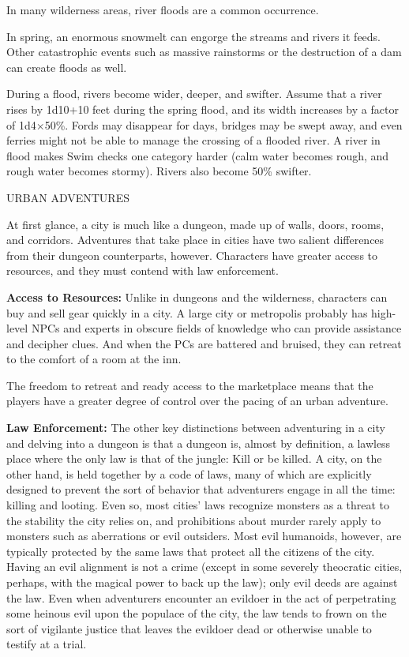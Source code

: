 \documentclass{article}
\begin{document}
In many wilderness areas, river floods are a common occurrence.

In spring, an enormous snowmelt can engorge the streams and rivers it feeds. Other 
catastrophic events such as massive rainstorms or the destruction of a dam can 
create floods as well.

During a flood, rivers become wider, deeper, and swifter. Assume that a river rises 
by 1d10+10 feet during the spring flood, and its width increases by a factor of 
1d4\ensuremath{\times}50\%. Fords may disappear for days, bridges may be swept 
away, and even ferries might not be able to manage the crossing of a flooded river. 
A river in flood makes Swim checks one category harder (calm water becomes rough, 
and rough water becomes stormy). Rivers also become 50\% swifter.

\vspace{12pt}
URBAN ADVENTURES

At first glance, a city is much like a dungeon, made up of walls, doors, rooms, 
and corridors. Adventures that take place in cities have two salient differences 
from their dungeon counterparts, however. Characters have greater access to resources, 
and they must contend with law enforcement.

\textbf{Access to Resources:} Unlike in dungeons and the wilderness, characters 
can buy and sell gear quickly in a city. A large city or metropolis probably has 
high-level NPCs and experts in obscure fields of knowledge who can provide assistance 
and decipher clues. And when the PCs are battered and bruised, they can retreat 
to the comfort of a room at the inn.

The freedom to retreat and ready access to the marketplace means that the players 
have a greater degree of control over the pacing of an urban adventure. 

\parindent=3pt
\textbf{Law Enforcement:} The other key distinctions between adventuring in a city 
and delving into a dungeon is that a dungeon is, almost by definition, a lawless 
place where the only law is that of the jungle: Kill or be killed. A city, on the 
other hand, is held together by a code of laws, many of which are explicitly designed 
to prevent the sort of behavior that adventurers engage in all the time: killing 
and looting. Even so, most cities' laws recognize monsters as a threat to the stability 
the city relies on, and prohibitions about murder rarely apply to monsters such 
as aberrations or evil outsiders. Most evil humanoids, however, are typically protected 
by the same laws that protect all the citizens of the city. Having an evil alignment 
is not a crime (except in some severely theocratic cities, perhaps, with the magical 
power to back up the law); only evil deeds are against the law. Even when adventurers 
encounter an evildoer in the act of perpetrating some heinous evil upon the populace 
of the city, the law tends to frown on the sort of vigilante justice that leaves 
the evildoer dead or otherwise unable to testify at a trial.
\end{document}
